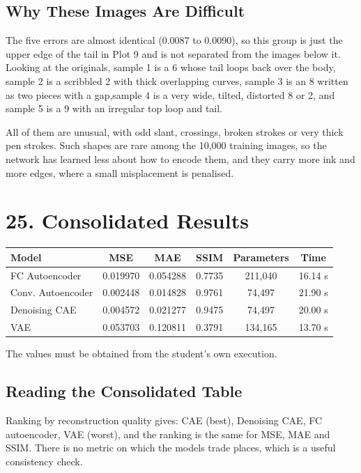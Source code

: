 \documentclass[10pt]{article}
\begin{document}
\subsection*{Why These Images Are Difficult}

The five errors are almost identical (0.0087 to 0.0090), so this group is just the
upper edge of the tail in Plot 9 and is not separated from the images below it.
Looking at the originals, sample 1 is a 6 whose tail loops back over the body, sample 2 is a scribbled 2 with thick
overlapping curves, sample 3 is an 8 written as two pieces with a gap,sample 4 is a very wide, tilted,
distorted 8 or 2, and sample 5 is a 9 with an irregular top loop and tail.

All of them are unusual, with odd slant, crossings, broken strokes or very thick
pen strokes. Such shapes are rare among the 10,000 training images, so the network
has learned less about how to encode them, and they carry more ink and more edges,
where a small misplacement is penalised.

\section*{25. Consolidated Results}

\begin{center}
\begin{tabular}{|l|c|c|c|c|c|}
\hline
Model & MSE & MAE & SSIM & Parameters & Time\\
\hline
FC Autoencoder & 0.019970 & 0.054288 & 0.7735 & 211,040 & 16.14 s\\
Conv. Autoencoder & 0.002448 & 0.014828 & 0.9761 & 74,497 & 21.90 s\\
Denoising CAE & 0.004572 & 0.021277 & 0.9475 & 74,497 & 20.00 s\\
VAE & 0.053703 & 0.120811 & 0.3791 & 134,165 & 13.70 s\\
\hline
\end{tabular}
\end{center}

The values must be obtained from the student's own execution.

\subsection*{Reading the Consolidated Table}

Ranking by reconstruction quality gives: CAE (best), Denoising CAE, FC
autoencoder, VAE (worst), and the ranking is the same for MSE, MAE and SSIM.
There is no metric on which the models trade places, which is a useful
consistency check.
\end{document}
